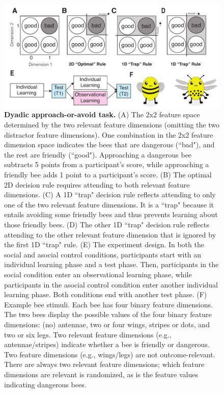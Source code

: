 \documentclass[11pt]{article} %
\begin{document}
\begin{figure}
    \centering
    \includegraphics[width=\textwidth]{exp-design-3.pdf}

    \caption{\textbf{Dyadic approach-or-avoid task.} (A) The 2x2 feature space determined by the two relevant feature dimensions (omitting the two distractor feature dimensions). One combination in the 2x2 feature dimension space indicates the bees that are dangerous (``bad"), and the rest are friendly (``good"). Approaching a dangerous bee subtracts 5 points from a participant's score, while approaching a friendly bee adds 1 point to a participant's score. (B) The optimal 2D decision rule requires attending to both relevant feature dimensions. (C) A 1D ``trap" decision rule reflects attending to only one of the two relevant feature dimensions. It is a ``trap" because it entails avoiding some friendly bees and thus prevents learning about those friendly bees. (D) The other 1D ``trap" decision rule reflects attending to the other relevant feature dimension that is ignored by the first 1D ``trap" rule. (E) The experiment design. In both the social and asocial control conditions, participants start with an individual learning phase and a test phase. Then, participants in the social condition enter an observational learning phase, while participants in the asocial control condition enter another individual learning phase. Both conditions end with another test phase. (F) Example bee stimuli. Each bee has four binary feature dimensions. The two bees display the possible values of the four binary feature dimensions: (no) antennae, two or four wings, stripes or dots, and two or six legs. Two relevant feature dimensions (e.g., antennae/stripes) indicate whether a bee is friendly or dangerous. Two feature dimensions (e.g., wings/legs) are not outcome-relevant. There are always two relevant feature dimensions; which feature dimensions are relevant is randomized, as is the feature values indicating dangerous bees.}
    \label{fig:exp-design}
\end{figure}
\end{document}
